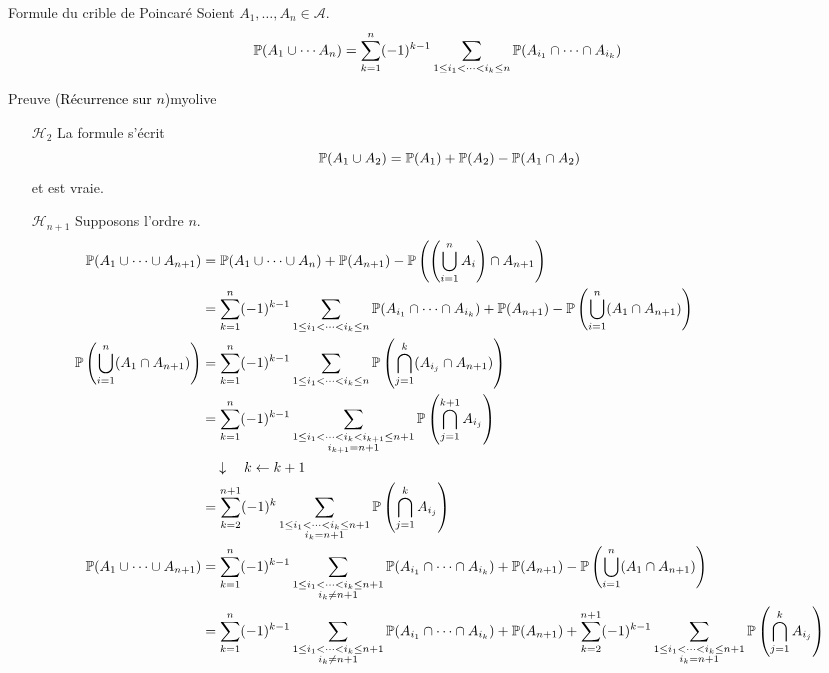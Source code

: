     \begin{prop}{Formule du crible de Poincaré}{}
        Soient $A_1, \ldots, A_n \in \mathcal{A}$. 
        \[ \P(A_1 \cup \cdots A_n) = \sum_{k = 1}^n (-1)^{k - 1} \sum_{1 \leq i_1 < \cdots < i_k \leq n} \P(A_{i_1} \cap \cdots \cap A_{i_k}) \]   
    \end{prop}

    \begin{demo}{Preuve \textcolor{black}{(Récurrence sur $n$)}}{myolive}
        \begin{itemize}
            \item[$\mathcal{H}_2$] \quad La formule s’écrit 
            \[ \P(A_1 \cup A_2) = \P(A_1) + \P(A_2) - \P(A_1 \cap A_2) \]   
            et est vraie.
            \item[$\mathcal{H}_{n + 1}$] \quad Supposons l’ordre $n$. 
            \begin{align*}
                \P(A_1 \cup \cdots \cup A_{n+1}) 
                &= \P(A_1 \cup \cdots \cup A_n) + \P(A_{n + 1}) - \P\left(\left(\bigcup_{i = 1}^n A_i\right) \cap A_{n+1} \right) \\
                &= \sum_{k = 1}^{n} (-1)^{k-1} \sum_{1 \leq i_1 < \cdots < i_k \leq n} \P(A_{i_1} \cap \cdots \cap A_{i_k}) + \P(A_{n+1}) - \P\left(\bigcup_{i = 1}^n (A_1 \cap A_{n + 1})\right) \\
                \P\left(\bigcup_{i = 1}^n (A_1 \cap A_{n + 1})\right) &= \sum_{k=1}^n (-1)^{k-1} \sum_{1 \leq i_1 < \cdots < i_k \leq n} \P\left(\bigcap_{j = 1}^k (A_{i_j} \cap A_{n+1})\right) \\
                &= \sum_{k=1}^n (-1)^{k-1} \sum_{\substack{1 \leq i_1 < \cdots < i_k < i_{k+1} \leq n+1 \\ i_{k+1} = n+1}} \P\left(\bigcap_{j = 1}^{k+1} A_{i_j}\right) \\
                &\quad \downarrow \quad k \leftarrow k+1 \\
                &= \sum_{k = 2}^{n+1} (-1)^k \sum_{\substack{1 \leq i_1 < \cdots < i_k\leq n+1 \\ i_{k} = n+1}} \P\left(\bigcap_{j = 1}^{k} A_{i_j}\right) \\
                \P(A_1 \cup \cdots \cup A_{n+1})
                &= \sum_{k = 1}^{n} (-1)^{k-1} \sum_{\substack{1 \leq i_1 < \cdots < i_k \leq n+1 \\ i_k \neq n+1}} \P(A_{i_1} \cap \cdots \cap A_{i_k}) + \P(A_{n+1}) - \P\left(\bigcup_{i = 1}^n (A_1 \cap A_{n + 1})\right) \\
                &= \sum_{k = 1}^{n} (-1)^{k-1} \sum_{\substack{1 \leq i_1 < \cdots < i_k \leq n+1 \\ i_k \neq n+1}} \P(A_{i_1} \cap \cdots \cap A_{i_k}) + \P(A_{n+1}) + \sum_{k = 2}^{n+1} (-1)^{k-1} \sum_{\substack{1 \leq i_1 < \cdots < i_k\leq n+1 \\ i_{k} = n+1}} \P\left(\bigcap_{j = 1}^{k} A_{i_j}\right) \\

\end{align*}
\end{itemize}
\end{demo}
